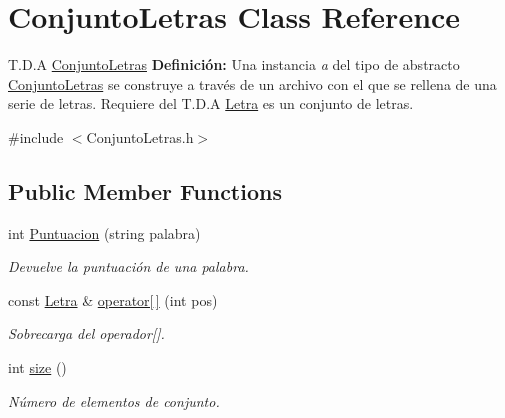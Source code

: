 \hypertarget{classConjuntoLetras}{\section{Conjunto\-Letras Class Reference}
\label{classConjuntoLetras}
}


T.\-D.\-A \hyperlink{classConjuntoLetras}{Conjunto\-Letras} {\bfseries Definición\-:} Una instancia {\itshape a} del tipo de abstracto \hyperlink{classConjuntoLetras}{Conjunto\-Letras} se construye a través de un archivo con el que se rellena de una serie de letras. Requiere del T.\-D.\-A \hyperlink{classLetra}{Letra} es un conjunto de letras.  




{\ttfamily \#include $<$Conjunto\-Letras.\-h$>$}

\subsection*{Public Member Functions}
\begin{DoxyCompactItemize}
\item 
int \hyperlink{classConjuntoLetras_ac280081a69b1abfc21522db42d21450d}{Puntuacion} (string palabra)
\begin{DoxyCompactList}\small\item\em Devuelve la puntuación de una palabra. \end{DoxyCompactList}\item 
const \hyperlink{classLetra}{Letra} \& \hyperlink{classConjuntoLetras_a25b6c7933c001598d44f029b5d436241}{operator\mbox{[}$\,$\mbox{]}} (int pos)
\begin{DoxyCompactList}\small\item\em Sobrecarga del operador\mbox{[}\mbox{]}. \end{DoxyCompactList}\item 
\hypertarget{classConjuntoLetras_adb0960e9e7a46a30572a84bb8f154b13}{int \hyperlink{classConjuntoLetras_adb0960e9e7a46a30572a84bb8f154b13}{size} ()}\label{classConjuntoLetras_adb0960e9e7a46a30572a84bb8f154b13}

\begin{DoxyCompactList}\small\item\em Número de elementos de conjunto. \end{DoxyCompactList}\end{DoxyCompactItemize}
